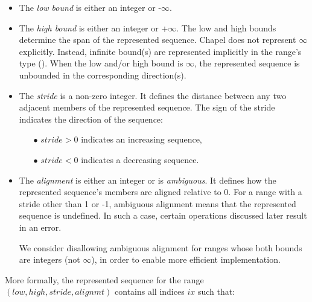 \begin{itemize}

\item The \emph{low bound} is either an integer or -$\infty$.

\item The \emph{high bound} is either an integer or +$\infty$.
  The low and high bounds determine the span of the represented sequence.
%
  Chapel does not represent $\infty$ explicitly. Instead, infinite
  bound(s) are represented implicitly in the range's type
  ().
  When the low and/or high bound is $\infty$, the represented sequence
  is unbounded in the corresponding direction(s).

\item The \emph{stride} is a non-zero integer.
  It defines the distance between any two adjacent members of the
  represented sequence.
  The sign of the stride indicates the direction of the sequence:
  \begin{itemize}
  \item[$\bullet$] $stride > 0$ indicates an increasing sequence,
  \item[$\bullet$] $stride < 0$ indicates a decreasing sequence.
  \end{itemize}

\item The \emph{alignment} is either an integer or is \emph{ambiguous}.
  It defines how the represented sequence's members are aligned relative to 0.
  For a range with a stride other than 1 or -1, 
  ambiguous alignment means that the represented sequence is undefined.
  In such a case, certain operations discussed later result in an error.

\begin{openissue}
We consider disallowing ambiguous alignment for ranges whose both bounds
are integers (not $\infty$), in order to enable more efficient
implementation.
\end{openissue}

\end{itemize}

More formally, the represented sequence for the range
$(low, high, stride, alignmt)$
contains all indices $ix$ such that:

